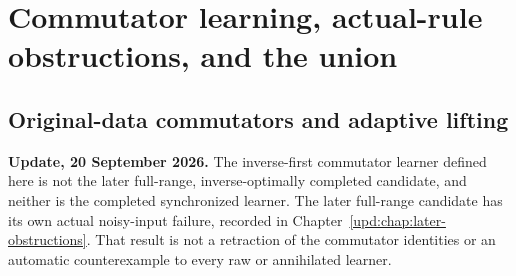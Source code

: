 \documentclass[11pt,oneside,openany,a4paper]{book}
\numberwithin{equation}{chapter}
\theoremstyle{definition}
\theoremstyle{remark}
\newcommand{\R}{\mathbb R}\newcommand{\E}{\mathbb E}\newcommand{\Prb}{\mathbb P}\newcommand{\PP}{\mathbb P}
\newcommand{\F}[1]{\left\lVert#1\right\rVert_F}
\newcommand{\op}[1]{\left\lVert#1\right\rVert_{\rm op}}
\DeclareMathOperator{\tr}{tr}\DeclareMathOperator{\rank}{rank}
\DeclareMathOperator{\diag}{blockdiag}\DeclareMathOperator{\range}{range}
\DeclareMathOperator{\ran}{range}\DeclareMathOperator{\OPT}{OPT}
\newcommand{\HH}{\mathcal H}\newcommand{\SSS}{\mathcal S}
\newcommand{\J}{\mathcal J}\newcommand{\transpose}{\mathsf T}
\begin{document}
\endgroup

\part{Commutator learning, actual-rule obstructions, and the union}

\begingroup
\let\E\relax
\newcommand{\E}{\mathbb E}
\let\R\relax
\newcommand{\R}{\mathbb R}
\let\F\relax
\newcommand{\F}[1]{\lVert #1\rVert_F}
\let\op\relax
\newcommand{\op}[1]{\lVert #1\rVert_{\mathrm{op}}}
\let\ran\relax
\newcommand{\ran}{\operatorname{range}}
\let\rank\relax
\newcommand{\rank}{\operatorname{rank}}
\let\diag\relax
\newcommand{\diag}{\operatorname{blockdiag}}
\let\OPT\relax
\newcommand{\OPT}{\operatorname{OPT}}
\let\dist\relax
\newcommand{\dist}{\operatorname{dist}}
\let\tr\relax
\newcommand{\tr}{\operatorname{tr}}
\let\HH\relax
\newcommand{\HH}{\mathcal H}
\let\SSS\relax
\newcommand{\SSS}{\mathcal S}
\let\J\relax
\newcommand{\J}{\mathcal J}
\let\Id\relax
\newcommand{\Id}{\mathrm I}
\chapter{Original-data commutators and adaptive lifting}\label{ch:comm}
\begin{scopebox}
\textbf{Update, 20 September 2026.} The inverse-first commutator learner defined here is not the later full-range, inverse-optimally completed candidate, and neither is the completed synchronized learner. The later full-range candidate has its own actual noisy-input failure, recorded in Chapter~\ref{upd:chap:later-obstructions}. That result is not a retraction of the commutator identities or an automatic counterexample to every raw or annihilated learner.
\end{scopebox}
\end{document}
